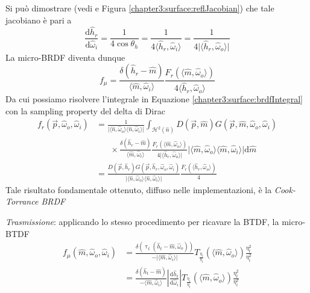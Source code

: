 Si pu\`o dimostrare (vedi \cite{pegoraro} e Figura \ref{chapter3:surface:reflJacobian}) che tale jacobiano \`e pari a
\begin{equation}
	\frac{\mathrm{d}\hat{h}_r}{\mathrm{d}\hat{\omega}_i} = \frac{1}{4\cos\theta_h}%
		= \frac{1}{4\langle\hat{h}_r,\hat{\omega}_i\rangle} %
		= \frac{1}{4\vert\langle\hat{h}_r,\hat{\omega}_o\rangle\vert}
\end{equation}
La micro-BRDF diventa dunque 
\begin{equation}
	f_\mu=\frac{\delta(\hat{h}_r-\hat{m})}{\langle\hat{m},\hat{\omega}_i\rangle}%
		\frac{F_r(\langle\hat{m},\hat{\omega}_o\rangle)}{4\langle\hat{h}_r,\hat{\omega}_o\rangle}
\end{equation}
Da cui possiamo risolvere l'integrale in Equazione \ref{chapter3:surface:brdfIntegral} con la sampling property del delta di Dirac
\begin{align}\label{chapter3:surface:cookTorrance}
	f_r(\vec{p},\hat{\omega}_o,\hat{\omega}_i)&=\frac{1}{\vert\langle\hat{n},\hat{\omega}_o\rangle\langle\hat{n},\hat{\omega}_i\rangle\vert}%
		\int_{\mathcal{H}^2(\hat{n})}D(\vec{p},\hat{m})G(\vec{p},\hat{m},\hat{\omega}_o,\hat{\omega}_i) \nonumber \\
		&\;\;\;\;\;\;\times\frac{\delta(\hat{h}_r-\hat{m})}{\langle\hat{m},\hat{\omega}_i\rangle}%
		\frac{F_r(\langle\hat{m},\hat{\omega}_o\rangle)}{4\vert\langle\hat{h}_r,\hat{\omega}_o\rangle\vert}%
		\vert\langle\hat{m},\hat{\omega}_o\rangle\langle\hat{m},\hat{\omega}_i\rangle\vert\mathrm{d}\hat{m} \nonumber \\
		&= \frac{D(\vec{p},\hat{h}_r)G(\vec{p},\hat{h}_r,\hat{\omega}_o,\hat{\omega}_i)}%
			{\vert\langle\hat{n},\hat{\omega}_o\rangle\langle\hat{n},\hat{\omega}_i\rangle\vert}\frac{F_r(\langle\hat{h}_r,\hat{\omega}_o\rangle)}{4}
\end{align}
Tale risultato fondamentale ottenuto, diffuso nelle implementazioni, \`e la \textit{Cook-Torrance BRDF}\par
\textit{Trasmissione}: applicando lo stesso procedimento per ricavare la BTDF, la micro-BTDF
\begin{align}
	f_\mu(\hat{m},\hat{\omega}_o,\hat{\omega}_i)&=%
		\frac{\delta(\uptau_t(\hat{h}_t-\hat{m},\hat{\omega}_o))}{-\vert\langle\hat{m},\hat{\omega}_i\rangle\vert}%
		T_{\frac{\eta_i}{\eta_t}}(\langle\hat{m},\hat{\omega}_o\rangle)%
		\frac{\eta_t^2}{\eta_i^2}
		\nonumber \\
		&= \frac{\delta(\hat{h}_t-\hat{m})}{-\langle\hat{m},\hat{\omega}_i\rangle}\left|\frac{\mathrm{d}\hat{h}_t}{\mathrm{d}\hat{\omega}_i}\right|%
		T_{\frac{\eta_i}{\eta_t}}(\langle\hat{m},\hat{\omega}_o\rangle)\frac{\eta_t^2}{\eta_i^2}
\end{align}
